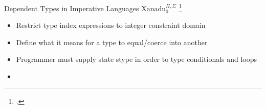\documentclass[aspectratio=169]{beamer}
\begin{document}
\begin{frame}{Dependent Types in Imperative Languages}
    $\text{Xanadu}_{0}^{\Pi,\Sigma}$ \footcite{xi_imperative_2000}
\begin{itemize}
    \item Restrict type index expressions to integer constraint domain
    \item Define what it means for a type to equal/coerce into another
    \item Programmer must supply state stype in order to type conditionals and loops
    \item {}
\end{itemize}
\end{frame}
\end{document}
